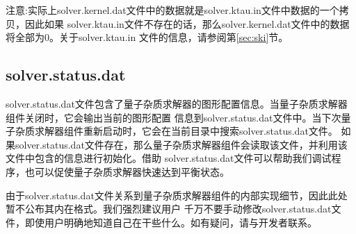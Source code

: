 注意:实际上solver.kernel.dat文件中的数据就是solver.ktau.in文件中数据的一个拷贝，因此如果
solver.ktau.in文件不存在的话，那么solver.kernel.dat文件中的数据将全部为0。关于solver.ktau.in
文件的信息，请参阅第\ref{sec:ski}节。

\subsection{solver.status.dat}
solver.status.dat文件包含了量子杂质求解器的图形配置信息。当量子杂质求解器组件关闭时，它会输出当前的图形配置
信息到solver.status.dat文件中。当下次量子杂质求解器组件重新启动时，它会在当前目录中搜索solver.status.dat文件。
如果solver.status.dat文件存在，那么量子杂质求解器组件会读取该文件，并利用该文件中包含的信息进行初始化。借助
solver.status.dat文件可以帮助我们调试程序，也可以促使量子杂质求解器快速达到平衡状态。

由于solver.status.dat文件关系到量子杂质求解器组件的内部实现细节，因此此处暂不公布其内在格式。我们强烈建议用户
千万不要手动修改solver.status.dat文件，即使用户明确地知道自己在干些什么。如有疑问，请与开发者联系。
